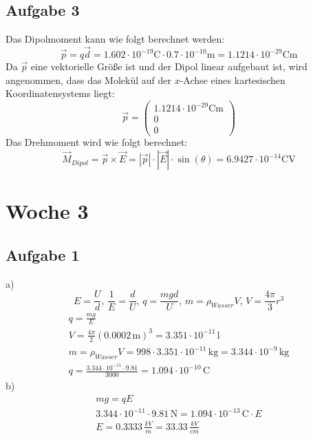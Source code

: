 \documentclass{article}
\begin{document}
\subsection*{Aufgabe 3}
Das Dipolmoment kann wie folgt berechnet werden:
\begin{equation*}
    \vec{p} = q\vec{d} = 1.602 \cdot 10^{-19} \mathrm{C} \cdot 0.7 \cdot 10^{-10} \mathrm{m} = 1.1214 \cdot 10^{-29} \mathrm{Cm} 
\end{equation*}
Da $\vec{p}$ eine vektorielle Größe ist und der Dipol linear aufgebaut ist, wird angenommen, dass das Molekül auf der $x$-Achse eines kartesischen Koordinatensystems liegt:
\begin{equation*}
    \vec{p} = \left(\begin{array}{c}1.1214 \cdot 10^{-29} \mathrm{Cm} \\0\\0\end{array}\right)
\end{equation*}
Das Drehmoment wird wie folgt berechnet:
\begin{equation*}
    \vec{M}_{Dipol} = \vec{p} \times \vec{E} = |\vec{p}| \cdot |\vec{E}| \cdot \sin(\theta) = 6.9427 \cdot 10^{-14} \mathrm{CV}
\end{equation*}

\section*{Woche 3}
\subsection*{Aufgabe 1}
a)\begin{equation*}
    E=\frac{U}{d},\, \frac{1}{E} = \frac{d}{U},\,q=\frac{mgd}{U},\,m=\rho_{Wasser}V,\,V=\frac{4\pi}{3}r^3
\end{equation*}
\begin{eqnarray*}
    q=\frac{mg}{E}\\
    V=\frac{4\pi}{2}(0.0002\,\mathrm{m})^3 = 3.351\cdot 10^{-11}\,\mathrm{l}\\
    m=\rho_{Wasser}V=998\cdot 3.351\cdot 10^{-11}\,\mathrm{kg}=3.344\cdot 10^{-9}\,\mathrm{kg}\\
    q=\frac{3.344\cdot 10^{-11}\cdot 9.81}{3000}=1.094\cdot 10^{-10}\,\mathrm{C}
\end{eqnarray*}
b)\begin{eqnarray*}
    mg=qE\\
    3.344\cdot 10^{-11}\cdot 9.81 \,\mathrm{N} = 1.094\cdot 10^{-13}\,\mathrm{C}\cdot E\\
    E = 0.3333\,\frac{kV}{m} = 33.33\,\frac{kV}{cm}
\end{eqnarray*}
\end{document}
